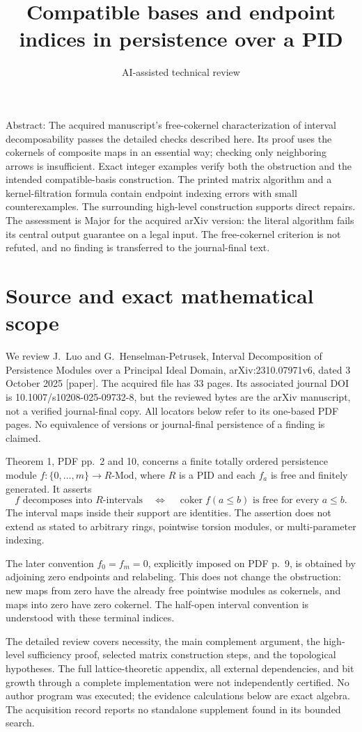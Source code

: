 \documentclass[10pt]{article}
\title{Compatible bases and endpoint indices in persistence over a PID}
\author{AI-assisted technical review}
\date{}
\begin{document}
\maketitle
Abstract: The acquired manuscript’s free-cokernel characterization of interval decomposability passes the detailed checks described here. Its proof uses the cokernels of composite maps in an essential way; checking only neighboring arrows is insufficient. Exact integer examples verify both the obstruction and the intended compatible-basis construction. The printed matrix algorithm and a kernel-filtration formula contain endpoint indexing errors with small counterexamples. The surrounding high-level construction supports direct repairs. The assessment is Major for the acquired arXiv version: the literal algorithm fails its central output guarantee on a legal input. The free-cokernel criterion is not refuted, and no finding is transferred to the journal-final text.\par
\section*{Source and exact mathematical scope}
We review J. Luo and G. Henselman-Petrusek, Interval Decomposition of Persistence Modules over a Principal Ideal Domain, arXiv:2310.07971v6, dated 3 October 2025 [paper]. The acquired file has 33 pages. Its associated journal DOI is 10.1007/s10208-025-09732-8, but the reviewed bytes are the arXiv manuscript, not a verified journal-final copy. All locators below refer to its one-based PDF pages. No equivalence of versions or journal-final persistence of a finding is claimed.\par
Theorem 1, PDF pp. 2 and 10, concerns a finite totally ordered persistence module \(f:\{0,\ldots,m\}\to R\text{-Mod}\), where \(R\) is a PID and each \(f_a\) is free and finitely generated. It asserts \[f\text{ decomposes into }R\text{-intervals}
 \quad\Longleftrightarrow\quad
 \operatorname{coker}f(a\le b)\text{ is free for every }a\le b.\] The interval maps inside their support are identities. The assertion does not extend as stated to arbitrary rings, pointwise torsion modules, or multi-parameter indexing.\par
The later convention \(f_0=f_m=0\), explicitly imposed on PDF p. 9, is obtained by adjoining zero endpoints and relabeling. This does not change the obstruction: new maps from zero have the already free pointwise modules as cokernels, and maps into zero have zero cokernel. The half-open interval convention is understood with these terminal indices.\par
The detailed review covers necessity, the main complement argument, the high-level sufficiency proof, selected matrix construction steps, and the topological hypotheses. The full lattice-theoretic appendix, all external dependencies, and bit growth through a complete implementation were not independently certified. No author program was executed; the evidence calculations below are exact algebra. The acquisition record reports no standalone supplement found in its bounded search.\par
\end{document}
